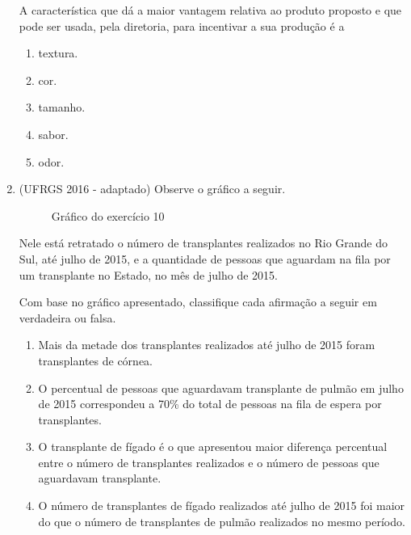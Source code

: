 \begin{enumerate}
A característica que dá a maior vantagem relativa ao produto proposto e que pode ser usada, pela diretoria, para incentivar a sua produção é a
\begin{enumerate}
\item {} 
textura.

\item {} 
cor.

\item {} 
tamanho.

\item {} 
sabor.

\item {} 
odor.

\end{enumerate}

\item (UFRGS 2016 - adaptado)  Observe o gráfico a seguir.

\begin{figure}[H]
\centering
\capstart

\noindent{}
\caption{Gráfico do exercício 10}\label{\detokenize{PE103-E:id3}}\label{\detokenize{PE103-E:id20}}\end{figure}

Nele está retratado o número de transplantes realizados no Rio Grande do Sul, até julho de 2015, e a quantidade de pessoas que aguardam na fila por um transplante no Estado, no mês de julho de 2015.

Com base no gráfico apresentado, classifique cada afirmação a seguir em verdadeira ou falsa.
\begin{enumerate}
\item {} 
Mais da metade dos transplantes realizados até julho de 2015 foram transplantes de córnea.

\item {} 
O percentual de pessoas que aguardavam transplante de pulmão em julho de 2015 correspondeu a 70\% do total de pessoas na fila de espera por transplantes.

\item {} 
O transplante de fígado é o que apresentou maior diferença percentual entre o número de transplantes realizados e o número de pessoas que aguardavam transplante.

\item {} 
O número de transplantes de fígado realizados até julho de 2015 foi maior do que o número de transplantes de pulmão realizados no mesmo período.


\end{enumerate}
\end{enumerate}
